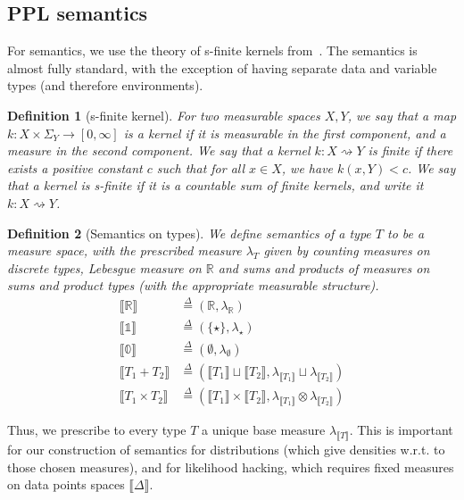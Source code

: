 \documentclass[preprint]{uai2026} %
\newtheorem{definition}{Definition}
\newcommand{\emptytype}{\mathbb{0}}
\newcommand{\unittype}{\mathbb{1}}
\newcommand{\RR}{\mathbb{R}}
\newcommand{\sem}[1]{\llbracket #1 \rrbracket}
\newcommand{\kto}{\rightsquigarrow}
\newcommand{\df}{\overset{\Delta}{=}}
\newcommand{\Meas}{\mathsf{Meas}}
\newcommand{\Prob}{\mathsf{Prob}}
\begin{document}
\subsection{PPL semantics}
\label{sec:ppl_semantics}

For semantics, we use the theory of s-finite kernels from~\citet{statonCommutativeSemanticsProbabilistic2017b}. The semantics is almost fully standard, with the exception of having separate data and variable types (and therefore environments). 

\begin{definition}[s-finite kernel]
For two measurable spaces $X, Y$, we say that a map $k: X \times \Sigma_Y \to [0, \infty]$ is a kernel if it is measurable in the first component, and a measure in the second component. We say that a kernel $k: X \kto Y$ is finite if there exists a positive constant $c$ such that for all $x \in X$, we have $k(x, Y) < c$. We say that a kernel is s-finite if it is a countable sum of finite kernels, and write it $k: X \kto Y$.
\end{definition}

\begin{definition}[Semantics on types]\label{def:sem-types}
    We define semantics of a type $T$ to be a measure space, with the prescribed measure $\lambda_T$ given by counting measures on discrete types, Lebesgue measure on $\mathbb{R}$ and sums and products of measures on sums and product types (with the appropriate measurable structure).
    \begin{align*}
        \sem{\RR} &\df (\mathbb{R},\lambda_{\mathbb{R}})  \\
        \sem{\unittype} &\df (\{\star\}, \lambda_{\star}) \\
        \sem{\emptytype} &\df (\emptyset, \lambda_{\emptyset}) \\
        \sem{T_1 + T_2} &\df (\sem{T_1} \sqcup \sem{T_2}, \lambda_{\sem{T_1}} \sqcup \lambda_{\sem{T_2}}) \\
        \sem{T_1 \times T_2} &\df (\sem{T_1} \times \sem{T_2}, \lambda_{\sem{T_1}} \otimes \lambda_{\sem{T_2}})
    \end{align*}
\end{definition}
Thus, we prescribe to every type $T$ a unique base measure $\lambda_{\sem{T}}$. This is important for our construction of semantics for distributions (which give densities w.r.t. to those chosen measures), and for likelihood hacking, which requires fixed measures on data points spaces $\sem{\Delta}$.
\end{document}

